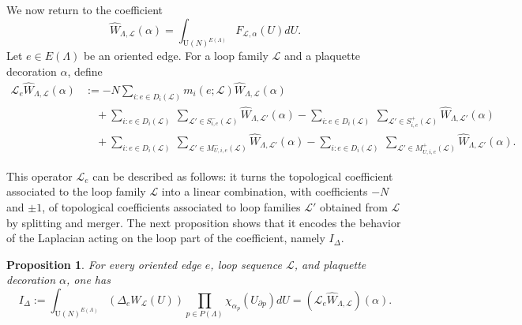 \documentclass[11pt,a4paper,reqno]{article}
\newtheorem{proposition}[theorem]{Proposition}
\theoremstyle{definition}
\theoremstyle{remark}
\newcommand\U{{\mathrm U}}
\newcommand\Lc{{\mathcal{L}}}
\begin{document}
We now return to the coefficient
\[
\widehat{W}_{\Lambda,\Lc}(\alpha)=\int_{\U(N)^{E(\Lambda)}} F_{\Lc,\alpha}(U) dU.
\]
Let $e\in E(\Lambda)$ be an oriented edge. For a loop family $\Lc$ and a plaquette decoration $\alpha$, define
\begin{align*}
\mathscr L_e \widehat{W}_{\Lambda,\Lc}(\alpha) &:=-N\sum_{i:e\in D_i(\Lc)}m_i(e;\Lc) \widehat{W}_{\Lambda,\Lc}(\alpha) \\
&\quad+ \sum_{i:e\in D_i(\Lc)}\ \sum_{\Lc'\in S^-_{i,e}(\Lc)} \widehat{W}_{\Lambda,\Lc'}(\alpha)- \sum_{i:e\in D_i(\Lc)}\ \sum_{\Lc'\in S^+_{i,e}(\Lc)} \widehat{W}_{\Lambda,\Lc'}(\alpha) \\
&\quad+ \sum_{i:e\in D_i(\Lc)}\ \sum_{\Lc'\in M^-_{U,i,e}(\Lc)} \widehat{W}_{\Lambda,\Lc'}(\alpha)- \sum_{i:e\in D_i(\Lc)}\ \sum_{\Lc'\in M^+_{U,i,e}(\Lc)} \widehat{W}_{\Lambda,\Lc'}(\alpha).
\end{align*}

This operator $\mathscr{L}_e$ can be described as follows: it turns the topological coefficient associated to the loop family $\Lc$ into a linear combination, with coefficients $-N$ and $\pm1$, of topological coefficients associated to loop families $\Lc'$ obtained from $\Lc$ by splitting and merger. The next proposition shows that it encodes the behavior of the Laplacian acting on the loop part of the coefficient, namely $I_\Delta$.

\begin{proposition}
\label{prop:universal-loop-laplacian-term}
For every oriented edge $e$, loop sequence $\Lc$, and plaquette decoration $\alpha$, one has
\[
I_\Delta:=\int_{\U(N)^{E(\Lambda)}}(\Delta_e W_{\Lc}(U))\prod_{p\in P(\Lambda)}\chi_{\alpha_p}(U_{\partial p}) dU=(\mathscr L_e \widehat{W}_{\Lambda,\Lc})(\alpha).
\]
\end{proposition}
\end{document}

